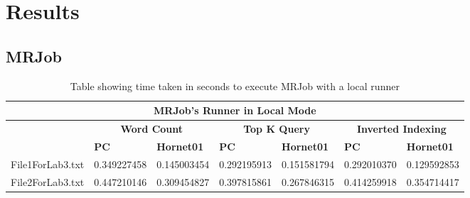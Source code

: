 \documentclass[10pt, twocolumn]{article}
\begin{document}
\section{Results}
\label{app:Results}
\subsection{MRJob}
\begin{table}[H]
\centering
\caption{Table showing time taken in seconds to execute MRJob with a local runner}
\label{tbl:MRJobLocalRunnerResults}
\begin{tabular}{|l|l|l|l|l|l|l|}
\hline
\multicolumn{7}{|c|}{\textbf{MRJob's Runner in Local Mode}}                                                                                                                                                 \\ \hline
\textbf{}                         & \multicolumn{2}{c|}{\textbf{Word Count}}                                  & \multicolumn{2}{c|}{\textbf{Top K Query}} & \multicolumn{2}{c|}{\textbf{Inverted Indexing}} \\ \hline
 &\multicolumn{1}{l|}{\textbf{PC}} & \multicolumn{1}{l|}{\textbf{Hornet01}} & \textbf{PC}      & \textbf{Hornet01}      & \textbf{PC}         & \textbf{Hornet01}         \\ \cline{1-7} 
File1ForLab3.txt                                  & 0.349227458                      & 0.145003454                            & 0.292195913      & 0.151581794            & 0.292010370         & 0.129592853               \\ \hline
File2ForLab3.txt                  & 0.447210146                      & 0.309454827                            & 0.397815861      & 0.267846315            & 0.414259918         & 0.354714417               \\ \hline
\end{tabular}
\end{table}
\end{document}
